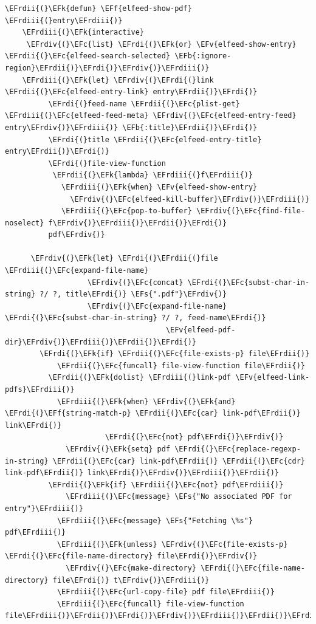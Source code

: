 \documentclass{scrartcl}
\newcommand{\EFk}[1]{\textcolor{EFk}{#1}} %
\newcommand{\EFs}[1]{\textcolor{EFs}{#1}} %
\newcommand{\EFb}[1]{\textcolor{EFb}{#1}} %
\newcommand{\EFc}[1]{\textcolor{EFc}{#1}} %
\newcommand{\EFv}[1]{\textcolor{EFv}{#1}} %
\newcommand{\EFf}[1]{\textcolor{EFf}{#1}} %
\newcommand{\EFrdi}[1]{\textcolor{EFrdi}{#1}} %
\newcommand{\EFrdii}[1]{\textcolor{EFrdii}{#1}} %
\newcommand{\EFrdiii}[1]{\textcolor{EFrdiii}{#1}} %
\newcommand{\EFrdiv}[1]{\textcolor{EFrdiv}{#1}} %
\begin{document}
\begin{Code}
\begin{Verbatim}[]
  \EFrdii{(}\EFk{defun} \EFf{elfeed-show-pdf} \EFrdiii{(}entry\EFrdiii{)}
    \EFrdiii{(}\EFk{interactive}
     \EFrdiv{(}\EFc{list} \EFrdi{(}\EFk{or} \EFv{elfeed-show-entry} \EFrdii{(}\EFc{elfeed-search-selected} \EFb{:ignore-region}\EFrdii{)}\EFrdi{)}\EFrdiv{)}\EFrdiii{)}
    \EFrdiii{(}\EFk{let} \EFrdiv{(}\EFrdi{(}link \EFrdii{(}\EFc{elfeed-entry-link} entry\EFrdii{)}\EFrdi{)}
          \EFrdi{(}feed-name \EFrdii{(}\EFc{plist-get} \EFrdiii{(}\EFc{elfeed-feed-meta} \EFrdiv{(}\EFc{elfeed-entry-feed} entry\EFrdiv{)}\EFrdiii{)} \EFb{:title}\EFrdii{)}\EFrdi{)}
          \EFrdi{(}title \EFrdii{(}\EFc{elfeed-entry-title} entry\EFrdii{)}\EFrdi{)}
          \EFrdi{(}file-view-function
           \EFrdii{(}\EFk{lambda} \EFrdiii{(}f\EFrdiii{)}
             \EFrdiii{(}\EFk{when} \EFv{elfeed-show-entry}
               \EFrdiv{(}\EFc{elfeed-kill-buffer}\EFrdiv{)}\EFrdiii{)}
             \EFrdiii{(}\EFc{pop-to-buffer} \EFrdiv{(}\EFc{find-file-noselect} f\EFrdiv{)}\EFrdiii{)}\EFrdii{)}\EFrdi{)}
          pdf\EFrdiv{)}

      \EFrdiv{(}\EFk{let} \EFrdi{(}\EFrdii{(}file \EFrdiii{(}\EFc{expand-file-name}
                   \EFrdiv{(}\EFc{concat} \EFrdi{(}\EFc{subst-char-in-string} ?/ ?, title\EFrdi{)} \EFs{".pdf"}\EFrdiv{)}
                   \EFrdiv{(}\EFc{expand-file-name} \EFrdi{(}\EFc{subst-char-in-string} ?/ ?, feed-name\EFrdi{)}
                                     \EFv{elfeed-pdf-dir}\EFrdiv{)}\EFrdiii{)}\EFrdii{)}\EFrdi{)}
        \EFrdi{(}\EFk{if} \EFrdii{(}\EFc{file-exists-p} file\EFrdii{)}
            \EFrdii{(}\EFc{funcall} file-view-function file\EFrdii{)}
          \EFrdii{(}\EFk{dolist} \EFrdiii{(}link-pdf \EFv{elfeed-link-pdfs}\EFrdiii{)}
            \EFrdiii{(}\EFk{when} \EFrdiv{(}\EFk{and} \EFrdi{(}\EFf{string-match-p} \EFrdii{(}\EFc{car} link-pdf\EFrdii{)} link\EFrdi{)}
                       \EFrdi{(}\EFc{not} pdf\EFrdi{)}\EFrdiv{)}
              \EFrdiv{(}\EFk{setq} pdf \EFrdi{(}\EFc{replace-regexp-in-string} \EFrdii{(}\EFc{car} link-pdf\EFrdii{)} \EFrdii{(}\EFc{cdr} link-pdf\EFrdii{)} link\EFrdi{)}\EFrdiv{)}\EFrdiii{)}\EFrdii{)}
          \EFrdii{(}\EFk{if} \EFrdiii{(}\EFc{not} pdf\EFrdiii{)}
              \EFrdiii{(}\EFc{message} \EFs{"No associated PDF for entry"}\EFrdiii{)}
            \EFrdiii{(}\EFc{message} \EFs{"Fetching \%s"} pdf\EFrdiii{)}
            \EFrdiii{(}\EFk{unless} \EFrdiv{(}\EFc{file-exists-p} \EFrdi{(}\EFc{file-name-directory} file\EFrdi{)}\EFrdiv{)}
              \EFrdiv{(}\EFc{make-directory} \EFrdi{(}\EFc{file-name-directory} file\EFrdi{)} t\EFrdiv{)}\EFrdiii{)}
            \EFrdiii{(}\EFc{url-copy-file} pdf file\EFrdiii{)}
            \EFrdiii{(}\EFc{funcall} file-view-function file\EFrdiii{)}\EFrdii{)}\EFrdi{)}\EFrdiv{)}\EFrdiii{)}\EFrdii{)}\EFrdi{)}
\end{Verbatim}
\end{Code}
\end{document}
